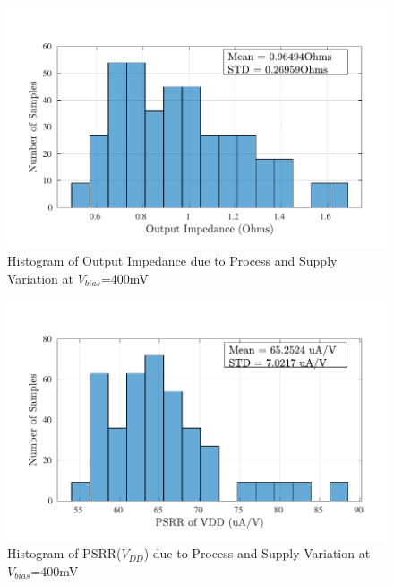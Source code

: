 \begin{figure} [H]
\centering
\includegraphics[scale=1]{Figures/Corners/Overall/PV_Mid/PDFs/PV_Mid_zout.pdf}
\caption{Histogram of Output Impedance due to Process and Supply Variation at $V_{bias}$=400mV}
\end{figure}

\begin{figure} [H]
\centering
\includegraphics[scale=1]{Figures/Corners/Overall/PV_Mid/PDFs/PV_Mid_psrrp.pdf}
\caption{Histogram of PSRR($V_{DD}$) due to Process and Supply Variation at $V_{bias}$=400mV}
\end{figure}

